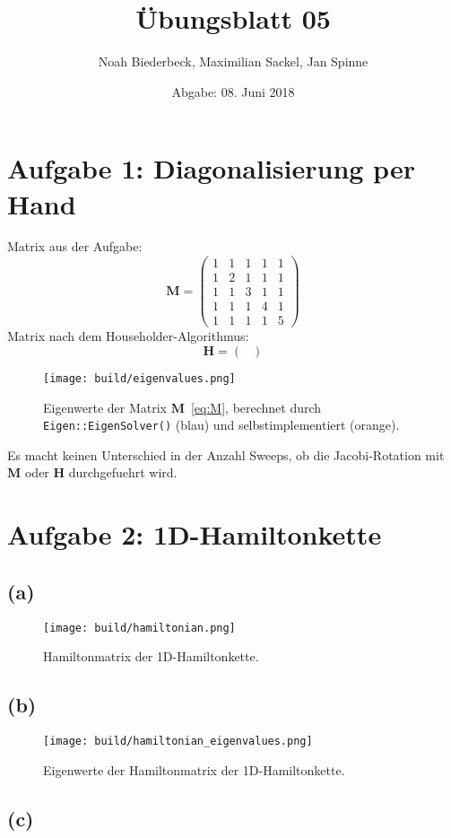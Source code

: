 \documentclass{scrartcl}
\title{Übungsblatt 05}
\author{%
		Noah Biederbeck, Maximilian Sackel, Jan Spinne
}
\date{Abgabe: 08. Juni 2018}
\begin{document}
\maketitle

\section*{Aufgabe 1: Diagonalisierung per Hand}
Matrix aus der Aufgabe:
\begin{equation}
  \label{eq:M}
  \mathbf{M} = \left(\begin{matrix}
      1 & 1 & 1 & 1 & 1 \\
      1 & 2 & 1 & 1 & 1 \\
      1 & 1 & 3 & 1 & 1 \\
      1 & 1 & 1 & 4 & 1 \\
      1 & 1 & 1 & 1 & 5
  \end{matrix}\right)
\end{equation}
Matrix nach dem Householder-Algorithmus:
\begin{equation}
  \label{eq:H}
  \mathbf{H} = \left(\begin{matrix}
    
\end{matrix}\right)
\end{equation}
\begin{figure}[ht]
  \centering
  \texttt{[image: build/eigenvalues.png]}
  \caption{Eigenwerte der Matrix $\mathbf{M}$~\eqref{eq:M}, berechnet durch \texttt{Eigen::EigenSolver()} (blau) und selbstimplementiert (orange).}%
  \label{fig:eigenvalues}
\end{figure}
Es macht keinen Unterschied in der Anzahl Sweeps, ob die Jacobi-Rotation mit $\mathbf{M}$ oder $\mathbf{H}$ durchgefuehrt wird.

\section*{Aufgabe 2: 1D-Hamiltonkette}
\subsection*{(a)}
\begin{figure}[ht]
  \centering
  \texttt{[image: build/hamiltonian.png]}
  \caption{Hamiltonmatrix der 1D-Hamiltonkette.}%
  \label{fig:hamiltonkette}
\end{figure}

\subsection*{(b)}
\begin{figure}[ht]
  \centering
  \texttt{[image: build/hamiltonian\_eigenvalues.png]}
  \caption{Eigenwerte der Hamiltonmatrix der 1D-Hamiltonkette.}%
  \label{fig:hamiltonkette_eigenvalues}
\end{figure}

\subsection*{(c)}
\end{document}
